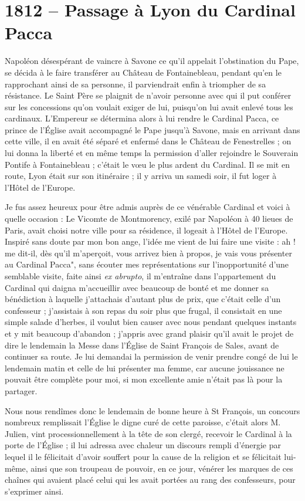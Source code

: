 \documentclass[11pt,a4paper]{report}
\begin{document}
\section*{1812 -- Passage à Lyon du Cardinal Pacca}

Napoléon désespérant de vaincre à Savone ce qu'il appelait l'obstination du Pape, se décida à le faire transférer au Château de Fontainebleau, pendant qu'en le rapprochant ainsi de sa personne, il parviendrait enfin à triompher de sa résistance. Le Saint Père se plaignit de n'avoir personne avec qui il put conférer sur les concessions qu'on voulait exiger de lui, puisqu'on lui avait enlevé tous les cardinaux. L'Empereur se détermina alors à lui rendre le Cardinal Pacca, ce prince de l'Église avait accompagné le Pape jusqu'à Savone, mais en arrivant dans cette ville, il en avait été séparé et enfermé dans le Château de Fenestrelles ; on lui donna la liberté et en même temps la permission d'aller rejoindre le Souverain Pontife à Fontainebleau ; c'était le vœu le plus ardent du Cardinal. Il se mit en route, Lyon était sur son itinéraire ; il y arriva un samedi soir, il fut loger à l'Hôtel de l'Europe.

Je fus assez heureux pour être admis auprès de ce vénérable Cardinal et voici à quelle occasion : Le Vicomte de Montmorency, exilé par Napoléon à 40 lieues de Paris, avait choisi notre ville pour sa résidence, il logeait à l'Hôtel de l'Europe. Inspiré sans doute par mon bon ange, l'idée me vient de lui faire une visite : ah ! me dit-il, dès qu'il m'aperçoit, vous arrivez bien à propos, je vais vous présenter au Cardinal Pacca", sans écouter mes représentations sur l'inopportunité d'une semblable visite, faite ainsi \textit{ex abrupto}, il m'entraîne dans l'appartement du Cardinal qui daigna m'accueillir avec beaucoup de bonté et me donner sa bénédiction à laquelle j'attachais d'autant plus de prix, que c'était celle d'un confesseur ; j'assistais à son repas du soir plus que frugal, il consistait en une simple salade d'herbes, il voulut bien causer avec nous pendant quelques instants et y mit beaucoup d'abandon ; j'appris avec grand plaisir qu'il avait le projet de dire le lendemain la Messe dans l'Église de Saint François de Sales, avant de continuer sa route. Je lui demandai la permission de venir prendre congé de lui le lendemain matin et celle de lui présenter ma femme, car aucune jouissance ne pouvait être complète pour moi, si mon excellente amie n'était pas là pour la partager.

Nous nous rendîmes donc le lendemain de bonne heure à St François, un concours nombreux remplissait l'Église le digne curé de cette paroisse, c'était alors M. Julien, vint processionnellement à la tête de son clergé, recevoir le Cardinal à la porte de l'Église ; il lui adressa avec chaleur un discours rempli d'énergie par lequel il le félicitait d'avoir souffert pour la cause de la religion et se félicitait lui-même, ainsi que son troupeau de pouvoir, en ce jour, vénérer les marques de ces chaînes qui avaient placé celui qui les avait portées au rang des confesseurs, pour s'exprimer ainsi.
\end{document}
